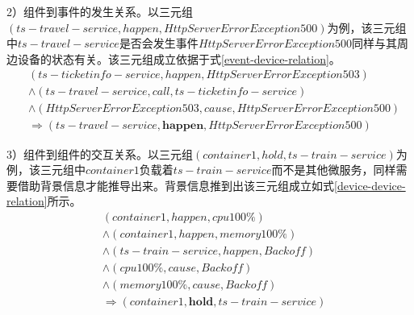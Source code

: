 
2）组件到事件的发生关系。以三元组$\left( ts-travel-service, happen, HttpServerError Exception 500 \right)$为例，该三元组中$ts-travel-service$是否会发生事件$HttpServerError Exception 500$同样与其周边设备的状态有关。该三元组成立依据于式\ref{event-device-relation}。
\begin{equation}
    \begin{aligned}
        &\left ( ts-ticketinfo-service, happen,  HttpServerError Exception 503\right ) \\
        &\wedge \left ( ts-travel-service, call, ts-ticketinfo-service \right ) \\
        &\wedge \left ( HttpServerError Exception 503, cause, HttpServerError Exception 500 \right ) \\
        &\Rightarrow \left ( ts-travel-service, \boldsymbol{happen}, HttpServerError Exception 500 \right )
    \end{aligned}
\label{event-device-relation}
\end{equation}

3）组件到组件的交互关系。以三元组$\left( container1, hold, ts-train-service \right)$为例，该三元组中$container1$负载着$ts-train-service$而不是其他微服务，同样需要借助背景信息才能推导出来。背景信息推到出该三元组成立如式\ref{device-device-relation}所示。
\begin{equation}
    \begin{aligned}
        &\left ( container1, happen,  cpu 100\% \right ) \\
        &\wedge \left ( container1, happen,  memory 100\% \right) \\
        &\wedge \left ( ts-train-service, happen,  Backoff \right) \\
        &\wedge \left ( cpu 100\%, cause,  Backoff \right) \\
        &\wedge \left ( memory 100\%, cause,  Backoff \right) \\
        &\Rightarrow \left ( container1, \boldsymbol{hold}, ts-train-service \right )
    \end{aligned}
\label{device-device-relation}
\end{equation}

